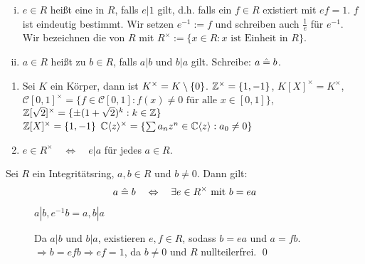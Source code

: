 \begin{defn} \label{def_1.2}
	\begin{enumerate}[(i)]
		\item $e \in R$ heißt eine  in $R$, falls $e | 1$ gilt, d.h. falls ein $f \in R$ existiert mit $ef = 1$. $f$ ist eindeutig bestimmt. Wir setzen $e^{-1} := f$ und schreiben auch $\frac{1}{e}$ für $e^{-1}$. \\
		Wir bezeichnen die  von $R$ mit $R^\times := \{x \in R : x \text{ ist Einheit in } R\}$.
		\item $a \in R$ heißt  zu $b \in R$, falls $a | b$ und $b | a$ gilt. Schreibe: $a \assoz b$.
	\end{enumerate}
\end{defn}

\begin{bsp}
	\begin{enumerate}[1)]
		\item Sei $K$ ein Körper, dann ist $K^\times = K \setminus \setnull$. \qquad $\ZZ^\times = \{1,-1\}$, \qquad $K[X]^\times = K^\times$, \\
		$\mathcal{C}[0,1]^\times = \{f \in \mathcal{C}[0,1] : f(x) \neq 0 \text{ für alle } x \in [0,1]\}$, \qquad  $\ZZ[\sqrt{2}]^\times = \{\pm (1+\sqrt{2})^k : k \in \ZZ \}$ \\
		$\ZZ[X]^\times = \{1, -1\}$ \qquad $\CC \sprod{z}^\times = \penbrace*{ \sum a_n z^n \in \CC \sprod{z} : a_0 \neq 0}$
		\item $e \in R^\times \quad \Leftrightarrow \quad e | a$ für jedes $a \in R$.
	\end{enumerate}
\end{bsp}

\begin{falko} \label{F1.2}
	Sei $R$ ein Integritätsring, $a, b \in R$ und $b \neq 0$. Dann gilt:
	\[ a \assoz b \quad \Leftrightarrow \quad \exists e \in R^\times \text{ mit } b = ea \]
\end{falko}

	\begin{description}
		\item[\bewrueck] $a | b, e^{-1}b = a, b | a$
		\item[\bewhin] Da $a | b$ und $b | a$, existieren $e, f \in R$, sodass $b = ea$ und $a = fb$. $\Rightarrow b = efb \Rightarrow ef = 1$, da $b \neq 0$ und $R$ nullteilerfrei. \qed
	\end{description}

